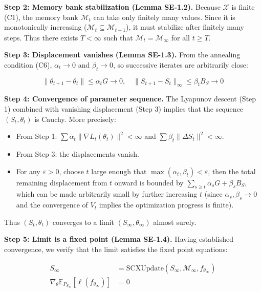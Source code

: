 \documentclass[
  12pt,
]{article}
\providecommand{\tightlist}{%
  \setlength{\itemsep}{0pt}\setlength{\parskip}{0pt}}
\begin{document}
\textbf{Step 2: Memory bank stabilization (Lemma SE-1.2).} Because
\(\mathcal{X}\) is finite (C1), the memory bank \(\mathcal{M}_t\) can
take only finitely many values. Since it is monotonically increasing
(\(\mathcal{M}_t \subseteq \mathcal{M}_{t+1}\)), it must stabilize after
finitely many steps. Thus there exists \(T < \infty\) such that
\(\mathcal{M}_{t} = \mathcal{M}_\infty\) for all \(t \geq T\).

\textbf{Step 3: Displacement vanishes (Lemma SE-1.3).} From the
annealing condition (C6), \(\alpha_t \to 0\) and \(\beta_t \to 0\), so
successive iterates are arbitrarily close:

\[
\|\theta_{t+1} - \theta_t\| \leq \alpha_t G \to 0, \quad \|S_{t+1} - S_t\|_\infty \leq \beta_t B_S \to 0
\]

\textbf{Step 4: Convergence of parameter sequence.} The Lyapunov descent
(Step 1) combined with vanishing displacement (Step 3) implies that the
sequence \((S_t, \theta_t)\) is Cauchy. More precisely:

\begin{itemize}
\tightlist
\item
  From Step 1: \(\sum \alpha_t \|\nabla L_t(\theta_t)\|^2 < \infty\) and
  \(\sum \beta_t \|\Delta S_t\|^2 < \infty\).
\item
  From Step 3: the displacements vanish.
\item
  For any \(\varepsilon > 0\), choose \(t\) large enough that
  \(\max(\alpha_t, \beta_t) < \varepsilon\), then the total remaining
  displacement from \(t\) onward is bounded by
  \(\sum_{s \geq t} \alpha_s G + \beta_s B_S\), which can be made
  arbitrarily small by further increasing \(t\) (since
  \(\alpha_s, \beta_s \to 0\) and the convergence of \(V_t\) implies the
  optimization progress is finite).
\end{itemize}

Thus \((S_t, \theta_t)\) converges to a limit
\((S_\infty, \theta_\infty)\) almost surely.

\textbf{Step 5: Limit is a fixed point (Lemma SE-1.4).} Having
established convergence, we verify that the limit satisfies the fixed
point equations:

\[
\begin{aligned}
S_\infty &= \text{SCXUpdate}(S_\infty, \mathcal{M}_\infty, f_{\theta_\infty}) \\
\nabla_\theta \mathbb{E}_{P_{S_\infty}}[\ell(f_{\theta_\infty})] &= 0
\end{aligned}
\]
\end{document}
